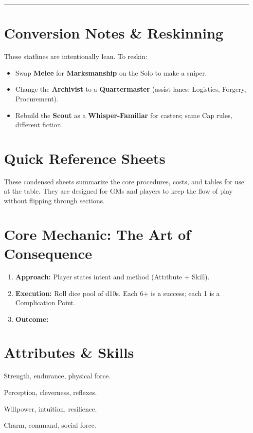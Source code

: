 \documentclass[12pt]{book}
\begin{document}
\bigskip
\hrule
\bigskip

\section{Conversion Notes \& Reskinning}
These statlines are intentionally lean. To reskin:
\begin{itemize}
  \item Swap \textbf{Melee} for \textbf{Marksmanship} on the Solo to make a sniper.
  \item Change the \textbf{Archivist} to a \textbf{Quartermaster} (assist lanes: Logistics, Forgery, Procurement).
  \item Rebuild the \textbf{Scout} as a \textbf{Whisper-Familiar} for casters; same Cap rules, different fiction.
\end{itemize}

\section{Quick Reference Sheets}

These condensed sheets summarize the core procedures, costs, and tables for use at the table.  
They are designed for GMs and players to keep the flow of play without flipping through sections.

\section*{Core Mechanic: The Art of Consequence}
\begin{enumerate}
  \item \textbf{Approach:} Player states intent and method (Attribute + Skill).
  \item \textbf{Execution:} Roll dice pool of d10s. Each 6+ is a success; each 1 is a Complication Point.
  \item \textbf{Outcome:}  
\end{enumerate}

\section*{Attributes \& Skills}
\begin{description}[leftmargin=2cm]
  \item[Body] Strength, endurance, physical force.  
  \item[Wits] Perception, cleverness, reflexes.  
  \item[Spirit] Willpower, intuition, resilience.  
  \item[Presence] Charm, command, social force.  
\end{description}
\end{document}
